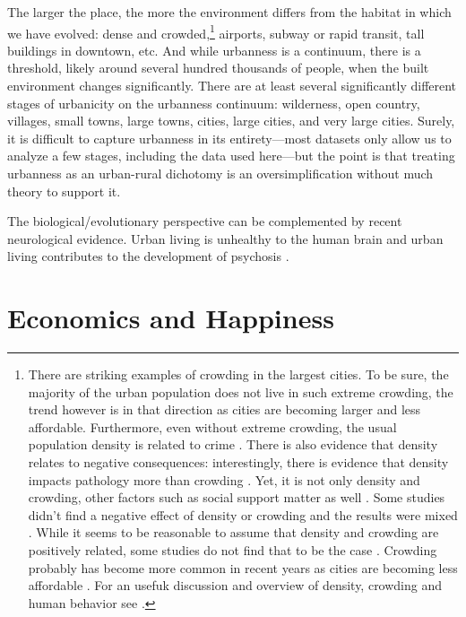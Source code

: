 \documentclass[10pt, letterpaper]{article}
\begin{document}
The larger the place, the more the environment differs from the habitat in which we have evolved: dense and crowded,\footnote{There are striking examples of crowding in the largest cities.  To be sure, the majority of the urban population does not live in such extreme crowding, the trend however is in that direction as cities are becoming larger and less affordable. Furthermore, even without extreme crowding, the usual population density is related to crime \citep{bettencourt10b}. There is also evidence that density relates to negative consequences: interestingly, there is evidence that density impacts pathology more than crowding \citep{levy1974effects}. Yet, it is not only density and crowding, other factors such as social support matter as well \citep{cassel2017health}. Some studies didn't find a negative effect of density or crowding and the results were mixed \citep{collette1976urban}. While it seems to be reasonable to assume that density and crowding are positively related, some studies do not find that to be the case \citep{webb1975meaning,rodgers1982density}. Crowding probably has become more common in recent years as cities are becoming less affordable \citep{misraCL15oct6,floridaCL18apr11,weinbergCL16aug11,solariMISC19apr24,schuetzMISC19may7,kotkin_db_mar20_13}.
 For an usefuk discussion and overview of density, crowding and human behavior see \citet{boots1979population,choldin1978urban}.}
airports, subway or rapid transit, tall buildings in downtown, etc. And while urbanness is a continuum, there is a threshold, likely around several hundred thousands of people, when the built environment changes significantly.
%
 There are at least several significantly different stages of urbanicity on the
 urbanness continuum: wilderness, open country, villages, small towns, large towns, cities, large
 cities, and very large cities. Surely, it is difficult to capture urbanness in
 its entirety---most datasets only allow us to analyze a few stages, including the data used
 here---but the point is that treating urbanness as an urban-rural dichotomy \citep[][]{glaeser11,burger20} is an
 oversimplification without much theory to support it.

The biological/evolutionary perspective can be complemented by recent neurological evidence. Urban living is unhealthy to the human brain \citep{lederbogen11} and urban living contributes to the development of psychosis \citep{abrahamyan20}.
 
\section*{Economics and Happiness} %
\end{document}
